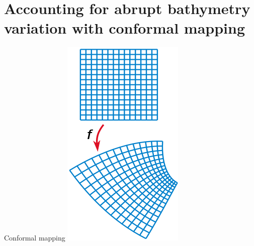 \documentclass{sintefbeamer}
\renewcommand{\_}[1]{_\mr{#1}}
\begin{document}

\section{Accounting for abrupt  bathymetry variation with conformal mapping}



\begin{frame}{Conformal mapping}
	\vspace{-5mm}
\centering
	\includegraphics[width=.22\framewidth]{220px-Conformal_map.svg.png}
	\hspace{2cm}

\end{frame}
\end{document}
